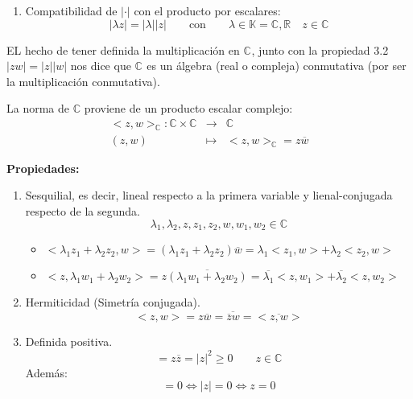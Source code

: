 \begin{enumerate}
\begin{proof}
\begin{eqnarray*}
        & &  \overset{3.1}{\leq} |z|^2+|w|^2+2|z\overline{w}| \overset{3.2 \;3.3}{=}|z|^2+|w|^2+2|z||w| = \\
        & & = (|z|+|w|)^2 \Rightarrow \\
        & & \Rightarrow |z+w| \leq |z|+|w|
      \end{eqnarray*}
    \end{proof}
  \item Compatibilidad de \( | \cdot | \) con el producto por escalares:
    \[ |\lambda z | = |\lambda| |z| \qquad \text{con} \qquad \lambda \in \mathbb{K}=\mathbb{C},\mathbb{R} \quad z \in \mathbb{C}\]

\end{enumerate}

EL hecho de tener definida la multiplicación en \(\mathbb{C}^{}\), junto con la propiedad 3.2 \(|zw| = |z||w|\) nos dice que \(\mathbb{C}^{}\) es un álgebra (real o compleja) conmutativa (por ser la multiplicación conmutativa).

La norma de \(\mathbb{C}\) proviene de un producto escalar complejo:
\begin{eqnarray*}
  <z,w>_{\mathbb{C}} : \mathbb{C} \times \mathbb{C} & \rightarrow & \mathbb{C} \\
  (z,w) & \mapsto & <z,w>_{\mathbb{C}} = z \overline{w}
\end{eqnarray*}

\textbf{Propiedades:}
\begin{enumerate}
  \item Sesquilial, es decir, lineal respecto a la primera variable y lienal-conjugada respecto de la segunda. 
    \[\lambda_1,\lambda_2,z,z_1,z_2,w,w_1,w_2\in \mathbb{C}\]
    \begin{itemize}
      \item \(<\lambda_1z_1+\lambda_2z_2,w> = (\lambda_1z_1+\lambda_2z_2)\overline{w} = \lambda_1 <z_1,w> + \lambda_2<z_2,w>\)
      \item \(<z,\lambda_1w_1+\lambda_2w_2> = z\overline{(\lambda_1w_1+\lambda_2w_2)} = \overline{\lambda_1} <z,w_1> + \overline{\lambda_2}<z,w_2>\)
    \end{itemize}
  \item Hermiticidad (Simetría conjugada).
    \[ <z,w> = z\overline{w}= \overline{\overline{z}w}= <\overline{z,w}> \] %
  \item Definida positiva.
    \[<z,z> = z \overline{z} = |z|^2 \geq 0 \qquad z \in \mathbb{C}\]
    Además:
    \[<z,z>=0 \Leftrightarrow |z| = 0 \Leftrightarrow z = 0\]
\end{enumerate}

